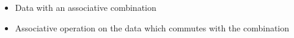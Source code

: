 \begin{itemize}
	\item Data with an associative combination
  \item Associative operation on the data which commutes with the combination
\end{itemize}
